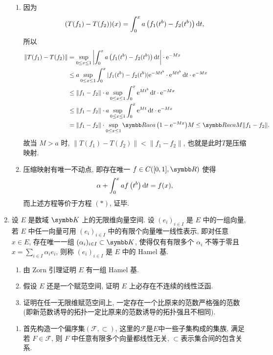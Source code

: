 \begin{enumerate}
\begin{answer}
\begin{enumerate}
        \item 因为
        \[(T(f_1)-T(f_2))(x)=\int_0^xa\left(f_1(t^b)-f_2(t^b)\right)\mathop{}\!\mathrm{d} t,\]
        所以
        \begin{align*}
            \|T(f_1)-T(f_2)\| & =\sup\limits_{0\leq x\leq 1}\left|\int_0^x a\left(f_1(t^b)-f_2(t^b)\right)\diff t\right|\cdot \e^{-Mx}\\
                              & \leq a\sup\limits_{0\leq x\leq 1}\int_0^x|f_1(t^b)-f_2(t^b)|\e^{-Mt^b}\cdot \e^{Mt^b}\diff t\cdot \e^{-Mx}\\
                              & \leq\|f_1-f_2\|\cdot a\sup\limits_{0\leq x\leq 1}\int_0^x \e^{Mt^b}\diff t\cdot \e^{-Mx}\\
                              & \leq\|f_1-f_2\|\cdot a\sup\limits_{0\leq x\leq 1}\int_0^x \e^{Mt}\diff t\cdot \e^{-Mx}\\
                              & =\|f_1-f_2\|\cdot\sup\limits_{0\leq x\leq 1}\R ac{a\left(1-\e^{-Mx}\right)}{M}\leq\R ac{a}{M}\|f_1-f_2\|.
        \end{align*}
        故当 $M>a$ 时, $\|T(f_1)-T(f_2)\|<\|f_1-f_2\|$, 也就是此时$T$是压缩映射.
        
        \item 压缩映射有唯一不动点, 即存在唯一 $f\in C([0,1],\R )$ 使得
        \[\alpha+\int_0^xaf\left(t^b\right)\mathop{}\!\mathrm{d} t=f(x),\]
        而上述方程等价于方程 $(*)$, 证毕.
      \end{enumerate}
    \end{answer}
  \item 设 $E$ 是数域 $\K$ 上的无限维向量空间. 设 $(e_i)_{i\in I}$
  是 $E$ 中的一组向量, 若 $E$ 中任一向量可用 $(e_i)_{i\in I}$
  中的有限个向量唯一线性表示, 即对任意 $x\in E$, 存在唯一一组 $(\alpha_i)_{i\in I}\subset\K$,
  使得仅有有限多个 $\alpha_i$ 不等于零且 $x=\sum_{i\in I}\alpha_ie_i$,
  则称 $(e_i)_{i\in I}$ 是 $E$ 中的 Hamel 基.
    \begin{enumerate}
        \item 由 Zorn 引理证明 $E$ 有一组 Hamel 基.
        \item 假设 $E$ 还是一个赋范空间, 证明 $E$ 上必存在不连续的线性泛函.
        \item 证明在任一无限维赋范空间上, 一定存在一个比原来的范数严格强的范数
              (即新范数诱导的拓扑一定比原来的范数诱导的拓扑强且不相同).
    \end{enumerate}
    \begin{answer}
      \begin{enumerate}
        \item 首先构造一个偏序集$(\mathcal{F},\subset)$, 这里的$\mathcal{F}$是$E$中一些子集构成的集族,
        满足若 $F\in\mathcal{F}$, 则 $F$ 中任意有限多个向量都线性无关, $\subset$表示集合间的包含关系.
        

\end{enumerate}
\end{answer}
\end{enumerate}
